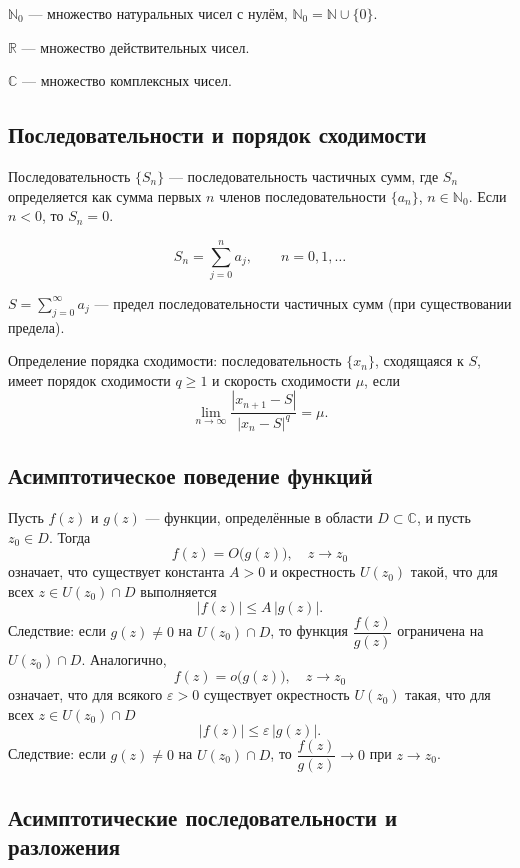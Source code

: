 \documentclass[14pt, a4paper]{extarticle}
\theoremstyle{definition}
\theoremstyle{remark}
\begin{document}
\(\mathbb{N}_0\) — множество натуральных чисел с нулём, \(\mathbb{N}_0=\mathbb{N}\cup\{0\}\).

\(\mathbb{R}\) — множество действительных чисел.

\(\mathbb{C}\) — множество комплексных чисел.

\subsection*{Последовательности и порядок сходимости}

Последовательность \(\{S_n\}\) — последовательность частичных сумм, где \(S_n\) определяется как сумма первых \(n\) членов последовательности \(\{a_n\}\), \(n\in\mathbb{N}_0\). Если \(n<0\), то \(S_n=0\).

\[
S_n=\sum_{j=0}^{n} a_j,\qquad n=0,1,\dots
\]

\(S=\sum_{j=0}^{\infty} a_j\) — предел последовательности частичных сумм (при существовании предела).

Определение порядка сходимости: последовательность \(\{x_n\}\), сходящаяся к \(S\), имеет порядок сходимости \(q\ge 1\) и скорость сходимости \(\mu\), если
\[
\lim_{n\to\infty}\frac{|x_{n+1}-S|}{|x_n-S|^q}=\mu.
\]

\subsection*{Асимптотическое поведение функций}

Пусть \(f(z)\) и \(g(z)\) — функции, определённые в области \(D\subset\mathbb{C}\), и пусть \(z_0\in D\). Тогда
\[
f(z)=O\bigl(g(z)\bigr),\quad z\to z_0
\]
означает, что существует константа \(A>0\) и окрестность \(U(z_0)\) такой, что для всех \(z\in U(z_0)\cap D\) выполняется
\[
|f(z)|\le A\,|g(z)|.
\]
Следствие: если \(g(z)\neq 0\) на \(U(z_0)\cap D\), то функция \(\dfrac{f(z)}{g(z)}\) ограничена на \(U(z_0)\cap D\). Аналогично,\
$$
f(z)=o\bigl(g(z)\bigr),\quad z\to z_0
$$
означает, что для всякого \(\varepsilon>0\) существует окрестность \(U(z_0)\) такая, что для всех \(z\in U(z_0)\cap D\)
\[
|f(z)|\le \varepsilon\,|g(z)|.
\]
Следствие: если \(g(z)\neq 0\) на \(U(z_0)\cap D\), то \(\dfrac{f(z)}{g(z)}\to 0\) при \(z\to z_0\).

\subsection*{Асимптотические последовательности и разложения}
\end{document}
